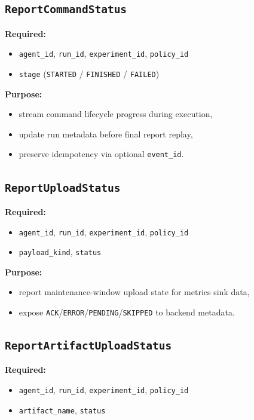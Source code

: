 \documentclass[11pt,a4paper]{article}
\begin{document}
\subsection{\texttt{ReportCommandStatus}}
\textbf{Required:}
\begin{itemize}
  \item \texttt{agent\_id}, \texttt{run\_id}, \texttt{experiment\_id}, \texttt{policy\_id}
  \item \texttt{stage} (\texttt{STARTED} / \texttt{FINISHED} / \texttt{FAILED})
\end{itemize}

\textbf{Purpose:}
\begin{itemize}
  \item stream command lifecycle progress during execution,
  \item update run metadata before final report replay,
  \item preserve idempotency via optional \texttt{event\_id}.
\end{itemize}

\subsection{\texttt{ReportUploadStatus}}
\textbf{Required:}
\begin{itemize}
  \item \texttt{agent\_id}, \texttt{run\_id}, \texttt{experiment\_id}, \texttt{policy\_id}
  \item \texttt{payload\_kind}, \texttt{status}
\end{itemize}

\textbf{Purpose:}
\begin{itemize}
  \item report maintenance-window upload state for metrics sink data,
  \item expose \texttt{ACK}/\texttt{ERROR}/\texttt{PENDING}/\texttt{SKIPPED} to backend metadata.
\end{itemize}

\subsection{\texttt{ReportArtifactUploadStatus}}
\textbf{Required:}
\begin{itemize}
  \item \texttt{agent\_id}, \texttt{run\_id}, \texttt{experiment\_id}, \texttt{policy\_id}
  \item \texttt{artifact\_name}, \texttt{status}
\end{itemize}
\end{document}
